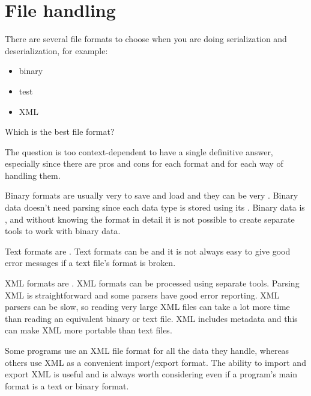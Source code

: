 
\chapter{File handling}

There are several file formats to choose when you are doing serialization and deserialization, for example:
\begin{itemize}
\item binary 
\item test
\item XML
\end{itemize}



Which is the best file format?

The question is too context-dependent to have a single definitive answer,
especially since there are pros and cons for each format and for each way of handling them.



Binary formats are usually very  to save and load and they can be very .
Binary data doesn’t need parsing since each data type is stored using its .
Binary data is , and without knowing the format in detail
it is not possible to create separate tools to work with binary data.


Text formats are .
Text formats can be  and
it is not always easy to give good error messages if a text file’s format is broken.



XML formats are .
XML formats can be processed using separate tools.
Parsing XML is straightforward and some parsers have good error reporting.
XML parsers can be slow, so reading very large XML files can take a lot more time than reading an equivalent binary or text file.
XML includes metadata and this can make XML more portable than text files.



Some programs use an XML file format for all the data they handle, whereas others use XML as a convenient import/export format.
The ability to import and export XML is useful and is always worth considering even if a program’s main format is a text or binary format.


